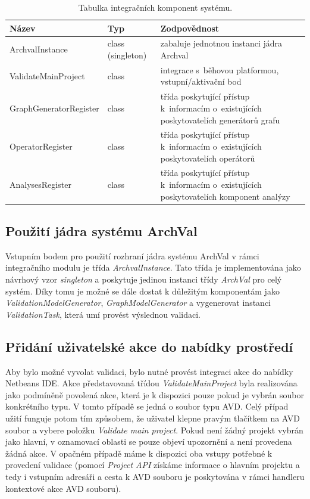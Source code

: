 \begin{table}
  \caption{Tabulka integračních komponent systému. \label{implementation-integration_components}}
  \begin{center}
    \begin{tabular}{ | l | l | p{8cm} | }
      \hline
      \textbf{Název} & \textbf{Typ} & \textbf{Zodpovědnost} \\
      \hline
      \hline
      ArchvalInstance & class (singleton) & zabaluje jednotnou instanci jádra Archval \\ \hline
      ValidateMainProject & class & integrace s~běhovou platformou, vstupní/aktivační bod \\ \hline
      GraphGeneratorRegister & class & třída poskytující přístup k~informacím o~existujících poskytovatelích generátorů grafu \\ \hline
      OperatorRegister & class & třída poskytující přístup k~informacím o~existujících poskytovatelích operátorů \\ \hline
      AnalysesRegister & class & třída poskytující přístup k~informacím o~existujících poskytovatelích komponent analýzy \\ \hline
    \end{tabular}
  \end{center}
\end{table}

\subsection{Použití jádra systému ArchVal}
Vstupním bodem pro použití rozhraní jádra systému ArchVal v rámci integračního modulu je třída \emph{ArchvalInstance}. Tato třída je implementována jako návrhový vzor \emph{singleton} a poskytuje jedinou instanci třídy \emph{ArchVal} pro celý systém. Díky tomu je možné se dále dostat k důležitým komponentám jako \emph{ValidationModelGenerator}, \emph{GraphModelGenerator} a vygenerovat instanci \emph{ValidationTask}, která umí provést výslednou validaci.

\subsection{Přidání uživatelské akce do nabídky prostředí}
Aby bylo možné vyvolat validaci, bylo nutné provést integraci akce do nabídky Netbeans IDE. Akce představovaná třídou \emph{ValidateMainProject} byla realizována jako podmíněně povolená akce, která je k dispozici pouze pokud je vybrán soubor konkrétního typu. V tomto případě se jedná o soubor typu AVD. Celý případ užití funguje potom tím způsobem, že uživatel klepne pravým tlačítkem na AVD soubor a vybere položku \emph{Validate main project}. Pokud není žádný projekt vybrán jako hlavní, v oznamovací oblasti se pouze objeví upozornění a není provedena žádná akce. V opačném případě máme k dispozici oba vstupy potřebné k provedení validace (pomocí \emph{Project API} získáme informace o hlavním projektu a tedy i vstupním adresáři a cesta k AVD souboru je poskytována v rámci handleru kontextové akce AVD souboru).

